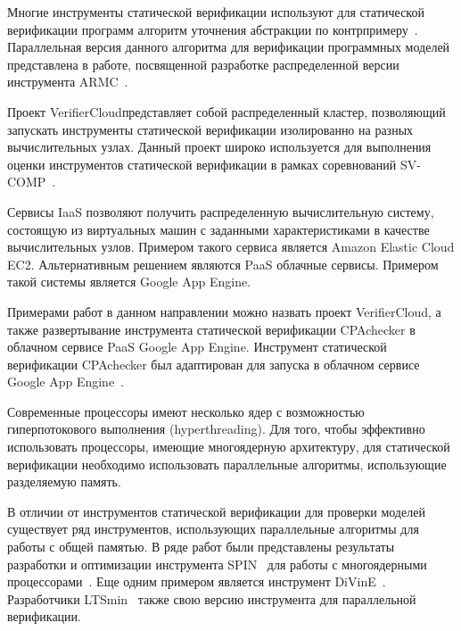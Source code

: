 \documentclass[%
candidate,     %
href,        %
colorlinks,  %
]{disser}
\begin{document}
Многие инструменты статической верификации используют для статической верификации программ алгоритм уточнения абстракции по контрпримеру~\cite{Clarke:2003:CAR}.
Параллельная версия данного алгоритма для верификации программных моделей представлена в работе, посвященной разработке распределенной версии инструмента ARMC~\cite{Lopes2011}.

Проект VerifierCloud\footnotemark представляет собой распределенный кластер, позволяющий запускать инструменты статической верификации изолированно на разных вычислительных узлах.
Данный проект широко используется для выполнения оценки инструментов статической верификации в рамках соревнований SV-COMP~\cite{SVCOMP2014,Beyer2016}.

Сервисы IaaS позволяют получить распределенную вычислительную систему, состоящую из виртуальных машин с заданными характеристиками в качестве вычислительных узлов.
Примером такого сервиса является Amazon Elastic Cloud EC2\footnotemark.
Альтернативным решением являются PaaS облачные сервисы.
Примером такой системы является Google App Engine\footnotemark.

Примерами работ в данном направлении можно назвать проект VerifierCloud, а также развертывание инструмента статической верификации CPAchecker в облачном сервисе PaaS Google App Engine.
Инструмент статической верификации CPAchecker был адаптирован для запуска в облачном сервисе Google App Engine~\cite{Beyer:2014:SVG}. 

Современные процессоры имеют несколько ядер с возможностью гиперпотокового выполнения (hyperthreading).
Для того, чтобы эффективно использовать процессоры, имеющие многоядерную архитектуру, для статической верификации необходимо использовать параллельные алгоритмы, использующие разделяемую память.

В отличии от инструментов статической верификации для проверки моделей существует ряд инструментов, использующих параллельные алгоритмы для работы с общей памятью.
В ряде работ были представлены результаты разработки и оптимизации инструмента SPIN~\cite{Holzmann:2003:SMC} для работы с многоядерными процессорами~\cite{5661793,Holzmann:2012:PSM}.
Еще одним примером является инструмент DiVinE~\cite{Barnat:2010:SSM}.
Разработчики LTSmin~\cite{Laarman2011,Laarman:2010:BMR} также свою версию инструмента для параллельной верификации.  
\end{document}
